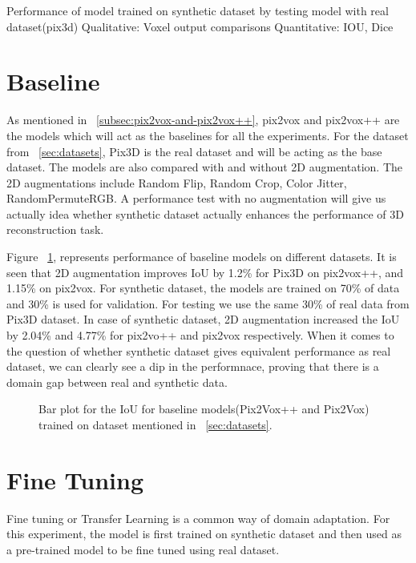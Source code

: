 Performance of model trained on synthetic dataset by testing model with real dataset(pix3d)
Qualitative: Voxel output comparisons
Quantitative: IOU, Dice

\section{Baseline}\label{sec:baseline}

As mentioned in ~\ref{subsec:pix2vox-and-pix2vox++}, pix2vox and pix2vox++ are the models which will act as the baselines for all the experiments.
For the dataset from ~\ref{sec:datasets}, Pix3D is the real dataset and will be acting as the base dataset.
The models are also compared with and without 2D augmentation.
The 2D augmentations include Random Flip, Random Crop, Color Jitter, RandomPermuteRGB.
A performance test with no augmentation will give us actually idea whether synthetic dataset actually enhances the performance of 3D reconstruction task.

Figure ~\ref{fig:baseline1}, represents performance of baseline models on different datasets.
It is seen that 2D augmentation improves IoU by 1.2\% for Pix3D on pix2vox++, and 1.15\% on pix2vox.
For synthetic dataset, the models are trained on 70\% of data and 30\% is used for validation.
For testing we use the same 30\% of real data from Pix3D dataset.
In case of synthetic dataset, 2D augmentation increased the IoU by 2.04\% and 4.77\%  for pix2vo++ and pix2vox respectively.
When it comes to the question of whether synthetic dataset gives equivalent performance as real dataset, we can clearly see a dip in the performnace,
proving that there is a domain gap between real and synthetic data.

\begin{figure}
    \centering
    \resizebox{\textwidth}{!}{}
    \caption{Bar plot for the IoU for baseline models(Pix2Vox++ and Pix2Vox) trained on dataset mentioned in ~\ref{sec:datasets}. }
    \label{fig:baseline1}
\end{figure}


\section{Fine Tuning}\label{sec:fine-tuning}
Fine tuning or Transfer Learning is a common way of domain adaptation.
For this experiment, the model is first trained on synthetic dataset and then used as a pre-trained model to be fine tuned using real dataset.

